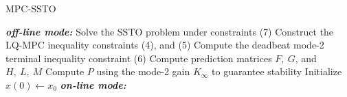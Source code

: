 \documentclass[12pt,a4paper]{report}
\begin{document}
	
\begin{algorithm}[H]
	\caption{MPC-SSTO}
	\textbf{\textit{off-line mode:}}\;
	Solve the SSTO problem under constraints (7)\;
	Construct the LQ-MPC inequality constraints (4), and (5)\;
	Compute the deadbeat mode-2 terminal inequality constraint (6)\;
	Compute prediction matrices $F,~G$, and $H,~L,~M$\;
	Compute $P$ using the mode-2 gain $K_\infty$ to guarantee stability\;
	Initialize $x(0)\leftarrow x_0$\;
	\textbf{\textit{on-line mode:}}\;
\end{algorithm}
\end{document}
